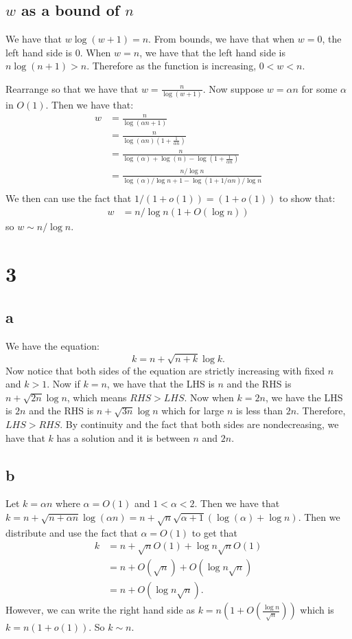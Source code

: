 \documentclass[]{article}
\begin{document}
\subsection{$w$ as a bound of $n$}
We have that $w \log (w + 1) = n$. 
From bounds, we have that when $w = 0$, the left hand side is $0$. When $w = n$, we have that the left hand side is $n \log(n + 1) > n$. Therefore as the function is increasing, $0 < w < n$. 

Rearrange so that we have that $w = \frac{n}{\log(w + 1)}$. Now suppose $w = \alpha n$ for some $\alpha$ in $O(1)$. Then we have that:
\begin{align*}
	w &= \frac{n}{\log(\alpha n + 1)}\\
	&= \frac{n}{\log(\alpha n) (1 + \frac{1}{\alpha n})}\\
	&=\frac{n}{\log(\alpha) + \log(n) - \log(1 + \frac{1}{\alpha n})}\\
	&= \frac{n/ \log n}{\log(\alpha)/\log n + 1 - \log(1 + 1/\alpha n)/\log n}\\
\end{align*}
We then can use the fact that $1/(1 + o(1)) = (1 + o(1))$ to show that:
\begin{align*}
	w &= n / \log n (1 + O(\log n))
\end{align*}
so $w \sim n / \log n$. 

\section{3}
\subsection{a}
We have the equation:
\begin{equation}
	k = n + \sqrt{n + k} \log k.
\end{equation}
Now notice that both sides of the equation are strictly increasing with fixed $n$ and $k > 1$. Now if $k = n$, we have that the LHS is $n$ and the RHS is $n + \sqrt{2n} \log n$, which means $RHS > LHS$. Now when $k = 2n$, we have the LHS is $2n$ and the RHS is $n + \sqrt{3n} \log n$ which for large $n$ is less than $2n$. Therefore, $LHS > RHS$. By continuity and the fact that both sides are nondecreasing, we have that $k$ has a solution and it is between $n$ and $2n$. 
\subsection{b}
Let $k = \alpha n$ where $\alpha = O(1)$ and $1 < \alpha < 2$. 
Then we have that 
$k = n + \sqrt{n + \alpha n} \log (\alpha n) = n + \sqrt{n} \sqrt{\alpha + 1} (\log(\alpha) + \log n)$. Then we distribute and use the fact that $\alpha = O(1)$ to get that
\begin{align*}
	k &= n + \sqrt{n} O(1) + \log n \sqrt{n} O(1)\\
	 &= n + O(\sqrt{n}) + O(\log n \sqrt{n})\\
	 &= n + O(\log n \sqrt n).
\end{align*}
However, we can write the right hand side as $k = n(1 + O(\frac{\log n}{\sqrt{n}}))$ which is $k = n(1 + o(1))$. So $k \sim n$. 
\end{document}
